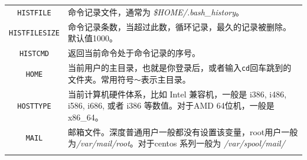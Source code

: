 \documentclass[doctor,openright,twoside]{sjtuthesis}
\newcommand{\passthrough}[1]{#1}
\theoremstyle{plain}
\theoremstyle{definition}
\theoremstyle{remark}
\theoremstyle{ocrenumbox}
\theoremstyle{plain}
\begin{document}
\begin{longtable}[]{@{}cl@{}}
\begin{minipage}[t]{0.23\columnwidth}
\passthrough{\lstinline!HISTFILE!}\strut
\end{minipage} & \begin{minipage}[t]{0.72\columnwidth}\raggedright
命令记录文件，通常为 \emph{\$HOME/.bash\_history}。\strut
\end{minipage}\tabularnewline
\begin{minipage}[t]{0.23\columnwidth}\centering
\passthrough{\lstinline!HISTFILESIZE!}\strut
\end{minipage} & \begin{minipage}[t]{0.72\columnwidth}\raggedright
命令记录条数，当超过此数，循环记录，最久的记录被删除。默认值1000。\strut
\end{minipage}\tabularnewline
\begin{minipage}[t]{0.23\columnwidth}\centering
\passthrough{\lstinline!HISTCMD!}\strut
\end{minipage} & \begin{minipage}[t]{0.72\columnwidth}\raggedright
返回当前命令处于命令记录的序号。\strut
\end{minipage}\tabularnewline
\begin{minipage}[t]{0.23\columnwidth}\centering
\passthrough{\lstinline!HOME!}\strut
\end{minipage} & \begin{minipage}[t]{0.72\columnwidth}\raggedright
当前用户的主目录，也就是你登录后，或者输入\passthrough{\lstinline!cd!}回车跳到的文件夹。常用符号\passthrough{\lstinline!～!}表示主目录。\strut
\end{minipage}\tabularnewline
\begin{minipage}[t]{0.23\columnwidth}\centering
\passthrough{\lstinline!HOSTTYPE!}\strut
\end{minipage} & \begin{minipage}[t]{0.72\columnwidth}\raggedright
当前计算机硬件体系，比如 Intel 兼容机，一般是 i386, i486, i586, i686,
或者 i386 等数值。对于AMD 64位机，一般是 x86\_64。\strut
\end{minipage}\tabularnewline
\begin{minipage}[t]{0.23\columnwidth}\centering
\passthrough{\lstinline!MAIL!}\strut
\end{minipage} & \begin{minipage}[t]{0.72\columnwidth}\raggedright
邮箱文件。深度普通用户一般都没有设置该变量，root用户一般为\emph{/var/mail/root}。对于centos
系列一般为 \emph{/var/spool/mail/}\strut
\end{minipage}\tabularnewline
\begin{minipage}[t]{0.23\columnwidth}\centering

\end{minipage}
\end{longtable}
\end{document}
